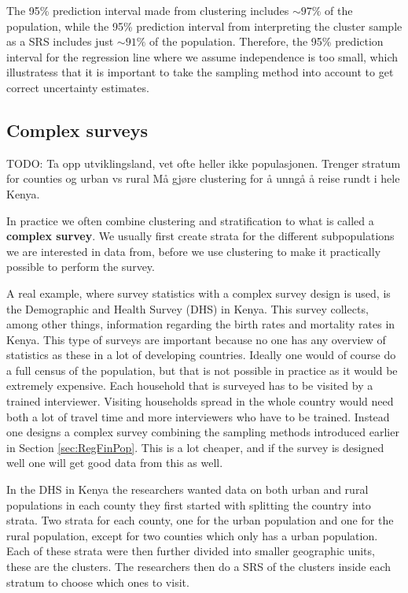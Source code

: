 \documentclass{article}
\begin{document}
\begin{example}
  The 95\% prediction interval made from clustering includes \(\sim 97\%\) of the
  population, while the 95\% prediction interval from interpreting the cluster
  sample as a SRS includes just \(\sim 91\%\) of the population. Therefore, the 95\%
  prediction interval for the regression line where we assume independence is
  too small, which illustratess that it
  is important to take the sampling method into account to get correct
  uncertainty estimates.

  
\end{example}

\subsection{Complex surveys}

TODO: Ta opp utviklingsland, vet ofte heller ikke populasjonen.
Trenger stratum for counties og urban vs rural
Må gjøre clustering for å unngå å reise rundt i hele Kenya.

In practice we often combine clustering and stratification to what is called a
\textbf{complex survey}. We usually first create strata for the different subpopulations
we are interested in data from, before we use clustering to make it
practically possible to perform the survey.

A real example, where survey statistics with a complex survey design is used, is the Demographic and Health
Survey (DHS) in Kenya. This survey collects, among other things, 
information regarding the birth rates and mortality rates in Kenya. This type of
surveys are important because no one has any overview of statistics as these in
a lot of developing countries.
Ideally one would of course do a full census of the population, but that is not
possible in practice as it would be extremely expensive. Each household that is
surveyed has to be visited by a trained interviewer. Visiting
households spread in the whole country would need both a lot of travel time and
more interviewers who have to be trained. Instead one designs a
complex survey combining the sampling methods introduced earlier in Section
\ref{sec:RegFinPop}. This is a lot cheaper, and if the survey is designed well
one will get good data from this as well.

In the DHS in Kenya the researchers wanted data on both urban and rural
populations in each county they first started with splitting the country into
strata. Two strata for each county, one for the urban population and one for the
rural population, except for two counties which only has a urban population.
Each of these strata were then further divided into smaller geographic units,
these are the clusters. The researchers then do a SRS of the clusters inside
each stratum to choose which ones to visit.
\end{document}
